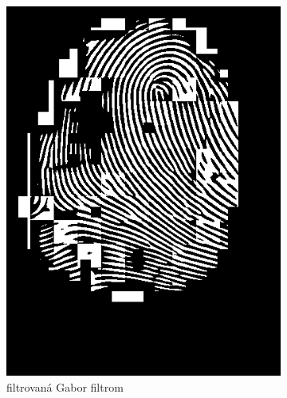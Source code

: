 \begin{figure}[h]
\begin{subfigure}[b]{0.3\linewidth}
      \includegraphics[width=\linewidth]{obrazky-figures/ecsema_gabor.png}
      \caption{filtrovaná Gabor filtrom}
    \end{subfigure}
    \hfill
    \begin{subfigure}[b]{0.3\linewidth}

\end{subfigure}
\end{figure}
